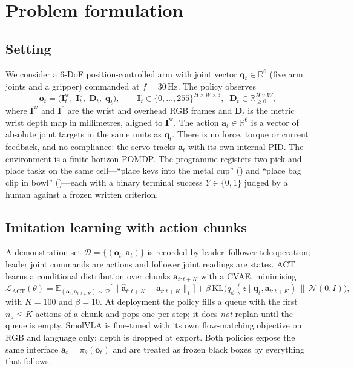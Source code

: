 \documentclass[11pt,a4paper]{article}
\theoremstyle{definition}
\newcommand{\obs}{\bm{o}}
\newcommand{\act}{\bm{a}}
\newcommand{\state}{\bm{q}}
\newcommand{\img}{\bm{I}}
\newcommand{\depthmap}{\bm{D}}
\newcommand{\pol}{\pi_\theta}
\newcommand{\E}{\mathbb{E}}
\newcommand{\R}{\mathbb{R}}
\begin{document}
\section{Problem formulation}
\label{sec:problem}

\subsection{Setting}

We consider a 6-DoF position-controlled arm with joint vector $\state_t\in\R^6$ (five arm joints and a gripper) commanded at $f=30$\,Hz. The policy observes
\begin{equation}
\obs_t = \big(\img^{\mathrm{w}}_t,\; \img^{\mathrm{o}}_t,\; \depthmap_t,\; \state_t\big),
\qquad \img^{\cdot}_t\in\{0,\dots,255\}^{H\times W\times 3},\;\; \depthmap_t\in\R_{\ge 0}^{H\times W},
\end{equation}
where $\img^{\mathrm{w}}$ and $\img^{\mathrm{o}}$ are the wrist and overhead RGB frames and $\depthmap_t$ is the metric wrist depth map in millimetres, aligned to $\img^{\mathrm{w}}$. The action $\act_t\in\R^6$ is a vector of absolute joint targets in the same units as $\state_t$. There is no force, torque or current feedback, and no compliance: the servo tracks $\act_t$ with its own internal PID. The environment is a finite-horizon POMDP. The programme registers two pick-and-place tasks on the same cell---``place keys into the metal cup'' () and ``place bag clip in bowl'' ()---each with a binary terminal success $Y\in\{0,1\}$ judged by a human against a frozen written criterion.

\subsection{Imitation learning with action chunks}

A demonstration set $\mathcal{D}=\{(\obs_t,\act_t)\}$ is recorded by leader--follower teleoperation; leader joint commands are actions and follower joint readings are states. ACT learns a conditional distribution over chunks $\act_{t:t+K}$ with a CVAE, minimising
\begin{equation}
\mathcal{L}_{\mathrm{ACT}}(\theta)
= \E_{(\obs_t,\act_{t:t+K})\sim\mathcal{D}}\Big[\big\|\hat{\act}_{t:t+K} - \act_{t:t+K}\big\|_1\Big]
+ \beta\, \mathrm{KL}\big(q_\phi(z\mid \state_t,\act_{t:t+K})\,\|\,\mathcal{N}(0,I)\big),
\label{eq:act}
\end{equation}
with $K=100$ and $\beta=10$. At deployment the policy fills a queue with the first $n_a\le K$ actions of a chunk and pops one per step; it does \emph{not} replan until the queue is empty. SmolVLA is fine-tuned with its own flow-matching objective on RGB and language only; depth is dropped at export. Both policies expose the same interface $\act_t=\pol(\obs_t)$ and are treated as frozen black boxes by everything that follows.
\end{document}
